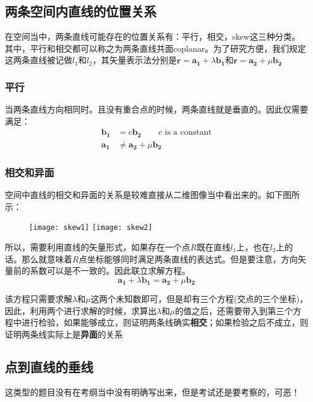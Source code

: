 \subsection*{两条空间内直线的位置关系}
在空间当中，两条直线可能存在的位置关系有：平行，相交，\gls{skew}这三种分类。其中，平行和相交都可以称之为两条直线共面coplanar。为了研究方便，我们规定这两条直线被记做$l_1$和$l_2$，其矢量表示法分别是$\mathbf{r}=\mathbf{a_1}+\lambda \mathbf{b_1}$和$\mathbf{r}=\mathbf{a_2}+\mu \mathbf{b_2}$

\subsubsection*{平行}
当两条直线方向相同时。且没有重合点的时候，两条直线就是垂直的。因此仅需要满足：
\begin{align*}
	\mathbf{b_1} &= c \mathbf{b_2} \qquad c \text{ is a constant}\\
	\mathbf{a_1} &\neq \mathbf{a_2}+\mu \mathbf{b_2}
\end{align*}

\subsubsection*{相交和异面}
空间中直线的相交和异面的关系是较难直接从二维图像当中看出来的。如下图所示：
\begin{figure}[H]
\texttt{[image: skew1]}
\texttt{[image: skew2]}
\end{figure}
所以，需要利用直线的矢量形式，如果存在一个点$R$既在直线$l_1$上，也在$l_2$上的话。那么就意味着$R$点坐标能够同时满足两条直线的表达式。但是要注意，方向矢量前的系数可以是不一致的。因此联立求解方程。
\[
	\mathbf{a_1}+\lambda \mathbf{b_1}=\mathbf{a_2}+\mu \mathbf{b_2}
\]

\begin{SummBox}
该方程只需要求解$\lambda$和$\mu$这两个未知数即可，但是却有三个方程(交点的三个坐标)，因此，利用两个进行求解的时候，求算出$\lambda$和$\mu$的值之后，还需要带入到第三个方程中进行检验，如果能够成立，则证明两条线确实\textbf{相交}；如果检验之后不成立，则证明两条线实际上是\textbf{异面}的关系
\end{SummBox}

\subsection*{点到直线的垂线}
这类型的题目没有在考纲当中没有明确写出来，但是考试还是要考察的，可恶！

